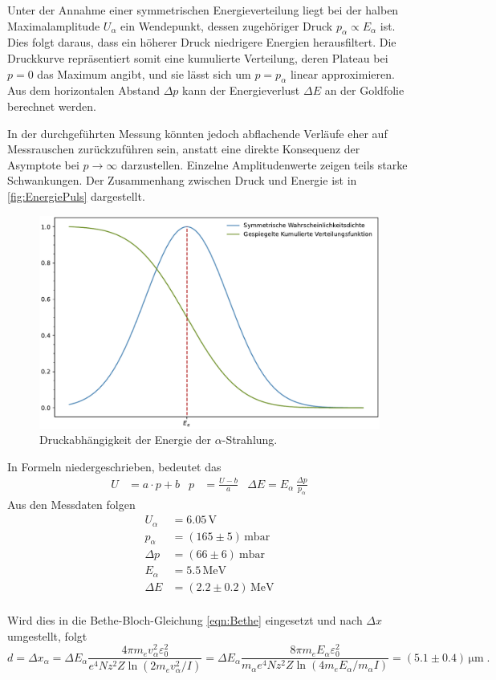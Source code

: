 Unter der Annahme einer symmetrischen Energieverteilung liegt bei der halben Maximalamplitude $U_\alpha$ ein Wendepunkt,  
dessen zugehöriger Druck $p_\alpha \propto E_\alpha$ ist. Dies folgt daraus, dass ein höherer Druck niedrigere Energien herausfiltert.  
Die Druckkurve repräsentiert somit eine kumulierte Verteilung, deren Plateau bei $p = 0$ das Maximum angibt, und sie lässt sich um $p = p_\alpha$ linear approximieren.  
Aus dem horizontalen Abstand $\Delta p$ kann der Energieverlust $\Delta E$ an der Goldfolie berechnet werden.  

In der durchgeführten Messung könnten jedoch abflachende Verläufe eher auf Messrauschen zurückzuführen sein,  
anstatt eine direkte Konsequenz der Asymptote bei $p \to \infty$ darzustellen. Einzelne Amplitudenwerte zeigen teils starke Schwankungen.  
Der Zusammenhang zwischen Druck und Energie ist in \autoref{fig:EnergiePuls} dargestellt.

\begin{figure}[h!]
    \centering
    \includegraphics[width=1\textwidth]{content/messung/EnergiePuls.pdf}
    \caption{Druckabhängigkeit der Energie der $\alpha$-Strahlung.}
    \label{fig:EnergiePuls}
\end{figure}

In Formeln niedergeschrieben, bedeutet das 
\begin{align*}
U &= a \cdot p + b & p &= \frac{U - b}{a} & \Delta E = E_\alpha \, \frac{\Delta p}{p_\alpha}
\end{align*}
Aus den Messdaten folgen 
\begin{align*}
U_{\alpha} &= 6.05\, \text{V}\\
p_{\alpha} &= (165\pm 5)\, \text{mbar}\\
\Delta p &= (66\pm 6)\ \text{mbar}\\
E_{\alpha} &= 5.5\, \text{MeV}\\
\Delta E &= (2.2\pm 0.2)\, \text{MeV}\\
\end{align*}

Wird dies in die Bethe-Bloch-Gleichung \ref{eqn:Bethe} eingesetzt und nach $\Delta x$ umgestellt, folgt
$$d = \Delta x_\alpha = \Delta E_\alpha \frac{4\pi m_e v_\alpha^2 \varepsilon_0^2}{e^4 N z^2 Z \ln (2m_e v_\alpha^2 / I)}
= \Delta E_\alpha \frac{8\pi m_e E_\alpha \varepsilon_0^2}{m_\alpha e^4 N z^2 Z \ln (4m_e E_\alpha / m_\alpha I)} = (5.1\pm 0.4) \, \unit{\micro \meter}
\; .$$